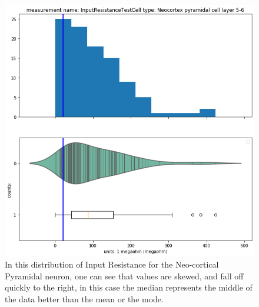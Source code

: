 \begin{figure} 
    \begin{center}   \includegraphics[scale=0.8]{figures/skewed_distribution.png}
    \end{center}
    \caption[Example of skewed NeuroElectro data]{In this distribution of Input Resistance for the Neo-cortical Pyramidal neuron, one can see that values are skewed, and fall off quickly to the right, in this case the median represents the middle of the data better than the mean or the mode.}
    \label{fig:skewed-feature}
\end{figure}   


    
